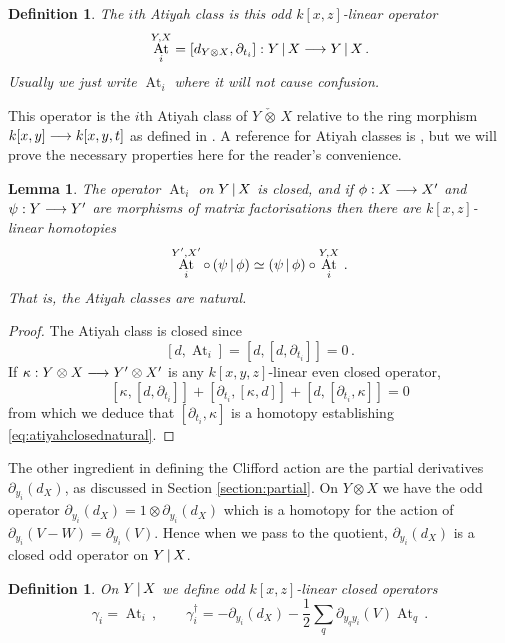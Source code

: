 \documentclass[english,letter paper,12pt,leqno]{article}
\newtheorem{lemma}[theorem]{Lemma}
\theoremstyle{example}
\newtheorem{definition}[theorem]{Definition}
\numberwithin{equation}{section}
\def\be{\begin{equation}}
\def\ee{\end{equation}}
\def\ferm{\gamma}
\def\fermc{\gamma^\dagger}
\DeclareMathOperator{\At}{At}
\begin{document}
\begin{definition} The $i$th Atiyah class is this odd $k[x,z]$-linear operator
\[
\At^{Y,X}_i = [d_{Y \otimes X}, \partial_{t_i}]: Y \l X \lto Y \l X \,.
\]
Usually we just write $\At_i$ where it will not cause confusion.
\end{definition}

This operator is the $i$th Atiyah class of $Y \,\check{\otimes}\, X$ relative to the ring morphism $k[x,y] \longrightarrow k[x,y,t]$ as defined in \cite[Section 9]{dm1102.2957}. A reference for Atiyah classes is \cite{buchweitz_flenner}, but we will prove the necessary properties here for the reader's convenience.

\begin{lemma}\label{lemma:atiyahclosed} The operator $\At_i$ on $Y \,|\, X$ is closed, and if $\phi: X \longrightarrow X'$ and $\psi: Y \longrightarrow Y'$ are morphisms of matrix factorisations then there are $k[x,z]$-linear homotopies
\be\label{eq:atiyahclosednatural}
\At^{Y',X'}_i \circ \,( \psi \l \phi ) \simeq ( \psi \l \phi ) \circ \At^{Y,X}_i\,.
\ee
That is, the Atiyah classes are \emph{natural}.
\end{lemma}
\begin{proof}
The Atiyah class is closed since
\[
[d, \At_i] = [d, [d, \partial_{t_i}]] = 0\,.
\]
If $\kappa: Y \otimes X \longrightarrow Y' \otimes X'$ is any $k[x,y,z]$-linear even closed operator, 
\[
[ \kappa, [ d, \partial_{t_i} ] ] + [ \partial_{t_i}, [\kappa, d]] + [ d, [ \partial_{t_i}, \kappa] ] = 0
\]
from which we deduce that $[\partial_{t_i}, \kappa]$ is a homotopy establishing \eqref{eq:atiyahclosednatural}.
\end{proof}

The other ingredient in defining the Clifford action are the partial derivatives $\partial_{y_i}(d_X)$, as discussed in Section \ref{section:partial}. On $Y \otimes X$ we have the odd operator $\partial_{y_i}(d_X) = 1 \otimes \partial_{y_i}(d_X)$ which is a homotopy for the action of $\partial_{y_i}(V - W) = \partial_{y_i}(V)$. Hence when we pass to the quotient, $\partial_{y_i}(d_X)$ is a closed odd operator on $Y \,|\, X$.

\begin{definition}\label{defn:cliffordaction_cut} On $Y \,|\, X$ we define odd $k[x,z]$-linear closed operators
\begin{equation}\label{eq:intro_clifford_act1}
\ferm_i = \At_i\,, \qquad \fermc_i = - \partial_{y_i}(d_X) - \frac{1}{2} \sum_q \partial_{y_q y_i}(V) \At_{q}\,.
\end{equation}
\end{definition}
\end{document}
